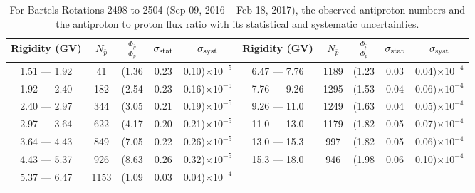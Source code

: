 \begin{table}[p] 
\renewcommand\baselinestretch{1.3}\selectfont
\setlength\tabcolsep{3pt}
\centering
\begin{tabular}{ccccc | ccccc}
\hline
\textbf{Rigidity}  (GV)  & $N_{\bar{p}}$ & $\frac{\Phi_{\bar{p}}}{\Phi_{p}}$ & $\sigma_{\rm{stat}}$ & $\sigma_{\rm{syst}}$ \hspace{1cm}   & \textbf{Rigidity}  (GV)  & $N_{\bar{p}}$ & $\frac{\Phi_{\bar{p}}}{\Phi_{p}}$ & $\sigma_{\rm{stat}}$ & $\sigma_{\rm{syst}}$ \hspace{1cm} \\ 
\hline
1.51 — 1.92   &  41                  &(1.36                          &  0.23              &      0.10)$\times 10^{-5}$  & 6.47 — 7.76                 &  1189                    &(1.23                                &  0.03                   &      0.04)$\times 10^{-4}$\\
1.92 — 2.40   &  182                &(2.54                          &  0.23              &      0.16)$\times 10^{-5}$  & 7.76 — 9.26                 &  1295                    &(1.53                                &  0.04                   &      0.06)$\times 10^{-4}$\\
2.40 — 2.97   &  344                &(3.05                          &  0.21              &      0.19)$\times 10^{-5}$  & 9.26 — 11.0                 &  1249                    &(1.63                                &  0.04                   &      0.05)$\times 10^{-4}$\\    
2.97 — 3.64   &  622                &(4.17                          &  0.20              &      0.21)$\times 10^{-5}$  & 11.0 — 13.0                 &  1179                   &(1.82                                &  0.05                   &      0.07)$\times 10^{-4}$\\    
3.64 — 4.43   &  849                &(7.05                          &  0.22              &      0.26)$\times 10^{-5}$ & 13.0 — 15.3                  &  997                    &(1.82                                &  0.05                   &      0.06)$\times 10^{-4}$\\
4.43 — 5.37   &  926                &(8.63                          &  0.26              &      0.32)$\times 10^{-5}$  & 15.3 — 18.0                 &  946                    &(1.98                                &  0.06                   &      0.10)$\times 10^{-4}$\\
5.37 — 6.47   &  1153              &(1.09                          &  0.03              &      0.04)$\times 10^{-4}$  & \\
\hline
\end{tabular}
\caption[Antiproton to proton flux ratio for Bartels Rotations 2498 to 2504]{For Bartels Rotations 2498 to 2504 (Sep 09, 2016 – Feb 18, 2017), the observed antiproton numbers and the antiproton to proton flux ratio with its statistical and systematic uncertainties.}
\label{TableOfDependent13}
\end{table}

